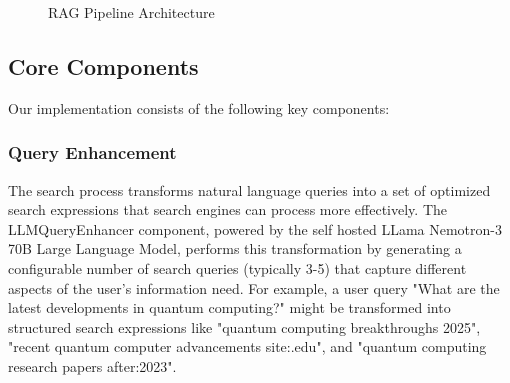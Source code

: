 \documentclass[fleqn,moreauthors,10pt]{ds_report}
\begin{document}
\begin{figure}[h]  
\centering  
{}  
\caption{RAG Pipeline Architecture}  
\end{figure}  
  
\subsection*{Core Components}  
Our implementation consists of the following key components:  
  
\subsubsection*{Query Enhancement}
The search process transforms natural language queries into a set of optimized search expressions that search engines can process more effectively. The LLMQueryEnhancer component, powered by the self hosted LLama Nemotron-3 70B Large Language Model, performs this transformation by generating a configurable number of search queries (typically 3-5) that capture different aspects of the user's information need. For example, a user query "What are the latest developments in quantum computing?" might be transformed into structured search expressions like "quantum computing breakthroughs 2025", "recent quantum computer advancements site:.edu", and "quantum computing research papers after:2023".
\end{document}
